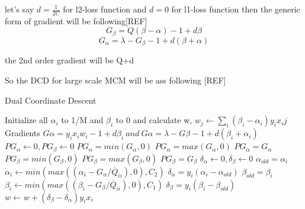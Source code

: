 let's say $d = \frac{1}{2C}$ for l2-loss function and  $d = 0$ for l1-loss function then the generic form of gradient will be following[REF]
\begin{equation}
G_\beta = Q(\beta - \alpha) -1 + d\beta
\end{equation}
\begin{equation}
G_\alpha = \lambda - G_\beta -1 + d(\beta + \alpha)
\end{equation}

the 2nd order gradient will be Q+d

So the DCD for large scale MCM will be ass following [REF]

\begin{algorithm}
\caption{Dual Coordinate Descent}\label{array-sum}
\begin{algorithmic}[1]
	\State Initialize all $\alpha_i$ to 1/M and $\beta_i$ to 0 and calculate w, $w_j \gets \sum_i{(\beta_i-\alpha_i)y_ix_ij}$
		    \State Gradients $G\alpha = y_ix_iw_i - 1 + d\beta_i \:and\:G\alpha = \lambda - G\beta - 1 + d(\beta_i+\alpha_i)$
		    \State $PG_\alpha \gets 0, PG_\beta \gets 0$
		    \State $PG_\alpha = min(G_\alpha,0)$
		    \State $PG_\alpha = max(G_\alpha,0)$
		    \Else
		    \State $PG_\alpha = G_\alpha$
		    \EndIf
		    \State $PG_\beta = min(G_\beta,0)$
		    \State $PG_\beta = max(G_\beta,0)$
		    \Else
		    \State $PG_\beta = G_\beta$
		    \EndIf
            \State $\delta_\alpha \gets 0 , \delta_\beta \gets 0$
                \State $\alpha_{old} = \alpha_i$
                \State $\alpha_i \gets min(max((\alpha_i - G_\alpha/\overline{Q}_{ii}),0),C_2)$
                \State $\delta_\alpha = y_i(\alpha_i - \alpha_{old})$
            \EndIf
                \State $\beta_{old} = \beta_i$
                \State $\beta_i \gets min(max((\beta_i - G_\beta/\overline{Q}_{ii}),0),C_1)$
                \State $\delta_\beta = y_i(\beta_i - \beta_{old})$
            \EndIf
                \State $w \gets  w + (\delta_\beta-\delta_\alpha)y_ix_i$
            \EndIf      
    	\EndFor
	\EndWhile
	\EndProcedure
\end{algorithmic}
\end{algorithm}


